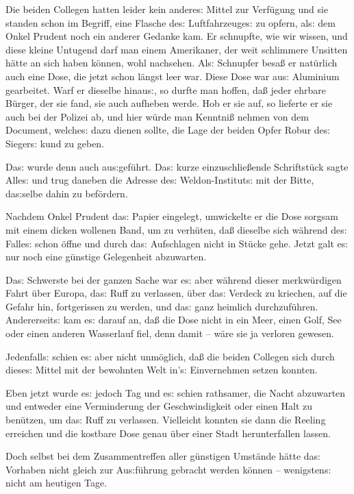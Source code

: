 \documentclass[oneside,12pt]{book}
\newcommand{\s}{s:}
\begin{document}
Die beiden Collegen hatten leider kein andere{\s} Mittel zur
Verf\"ugung und sie standen schon im Begriff, eine Flasche de{\s}
Luftfahrzeuge{\s} zu opfern, al{\s} dem Onkel Prudent noch ein
anderer Gedanke kam. Er schnupfte, wie wir wissen, und diese kleine
Untugend darf man einem Amerikaner, der weit schlimmere Unsitten
h\"atte an sich haben k\"onnen, wohl nachsehen. Al{\s} Schnupfer
besa{\ss} er nat\"urlich auch eine Dose, die jetzt schon l\"angst
leer war. Diese Dose war au{\s} Aluminium gearbeitet. Warf er
dieselbe hinau{\s}, so durfte man hoffen, da{\ss} jeder ehrbare
B\"urger, der sie fand, sie auch aufheben werde. Hob er sie auf, so
lieferte er sie auch bei der Polizei ab, und hier w\"urde man
Kenntni{\ss} nehmen von dem Document, welche{\s} dazu dienen sollte,
die Lage der beiden Opfer Robur de{\s} Sieger{\s} kund zu geben.

Da{\s} wurde denn auch au{\s}gef\"uhrt. Da{\s} kurze
einzuschlie{\ss}ende Schriftst\"uck sagte Alle{\s} und trug daneben
die Adresse de{\s} Weldon-Institut{\s} mit der Bitte, da{\s}selbe
dahin zu bef\"ordern.

Nachdem Onkel Prudent da{\s} Papier eingelegt, umwickelte er die Dose
sorgsam mit einem dicken wollenen Band, um zu verh\"uten, da{\ss}
dieselbe sich w\"ahrend de{\s} Falle{\s} schon \"offne und durch
da{\s} Aufschlagen nicht in St\"ucke gehe. Jetzt galt e{\s} nur noch
eine g\"unstige Gelegenheit abzuwarten.

Da{\s} Schwerste bei der ganzen Sache war e{\s} aber w\"ahrend dieser
merkw\"urdigen Fahrt \"uber Europa, da{\s} Ruff zu verlassen, \"uber
da{\s} Verdeck zu kriechen, auf die Gefahr hin, fortgerissen zu
werden, und da{\s} ganz heimlich durchzuf\"uhren. Andererseit{\s} kam
e{\s} darauf an, da{\ss} die Dose nicht in ein Meer, einen Golf, See
oder einen anderen Wasserlauf fiel, denn damit -- w\"are sie ja
verloren gewesen.

Jedenfall{\s} schien e{\s} aber nicht unm\"oglich, da{\ss} die beiden
Collegen sich durch diese{\s} Mittel mit der bewohnten Welt in'{\s}
Einvernehmen setzen konnten.

Eben jetzt wurde e{\s} jedoch Tag und e{\s} schien rathsamer, die
Nacht abzuwarten und entweder eine Verminderung der Geschwindigkeit
oder einen Halt zu ben\"utzen, um da{\s} Ruff zu verlassen.
Vielleicht konnten sie dann die Reeling erreichen und die kostbare
Dose genau \"uber einer Stadt herunterfallen lassen.

Doch selbst bei dem Zusammentreffen aller g\"unstigen Umst\"ande
h\"atte da{\s} Vorhaben nicht gleich zur Au{\s}f\"uhrung gebracht
werden k\"onnen -- wenigsten{\s} nicht am heutigen Tage.
\end{document}

